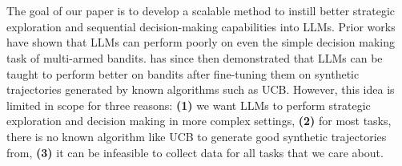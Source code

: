 \section{\ours{}}

\begin{table*}[h]
    \caption{\footnotesize Summary of the task groups used by \ours{}. }
    \label{tab:environment_summary}
    \centering
    \vspace{-0.3cm}
\end{table*}

The goal of our paper is to develop a scalable method to instill better strategic exploration and sequential decision-making capabilities into LLMs. Prior works~\citep{krishnamurthy2024largelanguagemodelsexplore} have shown that LLMs can perform poorly on even the simple decision making task of multi-armed bandits. \citet{nie2024evolveevaluatingoptimizingllms} has since then demonstrated that LLMs can be taught to perform better on bandits after fine-tuning them on synthetic trajectories generated by known algorithms such as UCB. However, this idea is limited in scope for three reasons: \textbf{(1)} we want LLMs to perform strategic exploration and decision making in more complex settings, \textbf{(2)} for most tasks, there is no known algorithm like UCB to generate good synthetic trajectories from, \textbf{(3)} it can be infeasible to collect data for all tasks that we care about.

